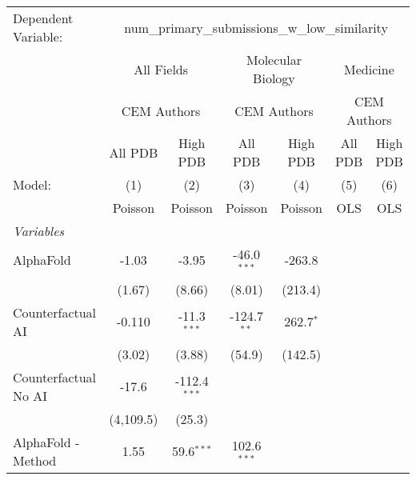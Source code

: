 \begingroup
\centering
\begin{tabular}{lcccccc}
   \tabularnewline \midrule \midrule
   Dependent Variable: & \multicolumn{6}{c}{num\_primary\_submissions\_w\_low\_similarity}\\
 & \multicolumn{2}{c}{All Fields} & \multicolumn{2}{c}{Molecular Biology} & \multicolumn{2}{c}{Medicine} \\
\cmidrule(lr){2-3} \cmidrule(lr){4-5} \cmidrule(lr){6-7}
 & \multicolumn{2}{c}{CEM Authors} & \multicolumn{2}{c}{CEM Authors} & \multicolumn{2}{c}{CEM Authors} \\
\cmidrule(lr){2-3} \cmidrule(lr){4-5} \cmidrule(lr){6-7}
 & \multicolumn{1}{c}{All PDB} & \multicolumn{1}{c}{High PDB} & \multicolumn{1}{c}{All PDB} & \multicolumn{1}{c}{High PDB} & \multicolumn{1}{c}{All PDB} & \multicolumn{1}{c}{High PDB} \\
\cmidrule(lr){2-2} \cmidrule(lr){3-3} \cmidrule(lr){4-4} \cmidrule(lr){5-5} \cmidrule(lr){6-6} \cmidrule(lr){7-7}
   Model:                                                  & (1)       & (2)            & (3)           & (4)         & (5)  & (6)\\  
                                                           &  Poisson  & Poisson        & Poisson       & Poisson     & OLS  & OLS\\  
   \midrule
   \emph{Variables}\\
   AlphaFold                                               & -1.03     & -3.95          & -46.0$^{***}$ & -263.8      &      &   \\   
                                                           & (1.67)    & (8.66)         & (8.01)        & (213.4)     &      &   \\   
   Counterfactual AI                                       & -0.110    & -11.3$^{***}$  & -124.7$^{**}$ & 262.7$^{*}$ &      &   \\   
                                                           & (3.02)    & (3.88)         & (54.9)        & (142.5)     &      &   \\   
   Counterfactual No AI                                    & -17.6     & -112.4$^{***}$ &               &             &      &   \\   
                                                           & (4,109.5) & (25.3)         &               &             &      &   \\   
   AlphaFold - Method                                      & 1.55      & 59.6$^{***}$   & 102.6$^{***}$ &             &      &   \\   

\end{tabular}
